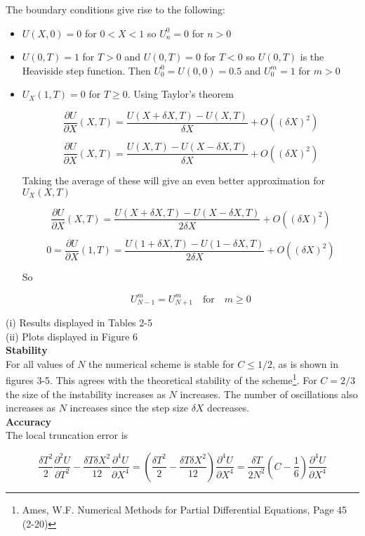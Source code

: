 \documentclass[12pt]{extarticle}
\begin{document}
The boundary conditions give rise to the following:
\begin{itemize}
\item $U(X,0) = 0$ for $0<X<1$ so $U_n^0 = 0$ for $n > 0$
\item $U(0,T) = 1$ for $T>0$ and $U(0,T) = 0$ for $T<0$ so $U(0,T)$ is the Heaviside step function. Then $U_0^0 = U(0,0) = 0.5$ and $U_0^m = 1$ for $m>0$
\item $U_X(1,T) = 0$ for $T\geq0$. Using Taylor's theorem 

$$\frac{\partial U}{\partial X}(X,T) = \frac{U(X+\delta X,T)-U(X,T)}{\delta X}+O((\delta X)^2) $$

$$\frac{\partial U}{\partial X}(X,T) = \frac{U(X,T)-U(X-\delta X,T)}{\delta X}+O((\delta X)^2) $$

Taking the average of these will give an even better approximation for $U_X(X,T)$
 
$$\frac{\partial U}{\partial X}(X,T) = \frac{U(X+\delta X,T)-U(X-\delta X,T)}{2\delta X}+O((\delta X)^2) $$

$$0=\frac{\partial U}{\partial X}(1,T) = \frac{U(1+\delta X,T)-U(1-\delta X,T)}{2\delta X}+O((\delta X)^2) $$

So

$$U_{N-1}^m = U_{N+1}^m \quad \mathrm{for} \quad m\geq0$$
\end{itemize}

(i) Results displayed in Tables 2-5\\

(ii) Plots displayed in Figure 6\\ 

\textbf{Stability}\\

For all values of $N$ the numerical scheme is stable for $C \leq 1/2$, as is shown in figures 3-5. This agrees with the theoretical stability of the scheme\footnote{Ames, W.F. Numerical Methods for Partial Differential Equations, Page 45 (2-20)}. For $C=2/3$ the size of the instability increases as $N$ increases. The number of oscillations also increases as $N$ increases since the step size $\delta X$ decreases. \\

\textbf{Accuracy}\\

The local truncation error is 

$$\frac{\delta T^2}{2}\frac{\partial ^2 U}{\partial T^2 } - \frac{\delta T\delta X^2}{12}\frac{\partial ^4 U}{\partial X^4 } = \left(\frac{\delta T^2}{2}- \frac{\delta T\delta X^2}{12}\right)\frac{\partial ^4 U}{\partial X^4 } = \frac{\delta T}{2N^2}\left(C-\frac{1}{6}\right)\frac{\partial ^4 U}{\partial X^4 } $$
\end{document}
